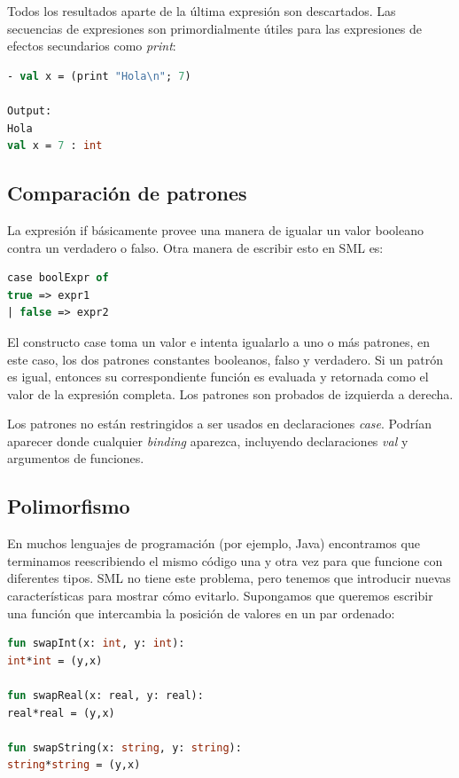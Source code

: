 \documentclass[10pt,journal,compsoc]{IEEEtran}
\begin{document}
Todos los resultados aparte de la \'ultima expresi\'on son descartados. Las secuencias de expresiones son primordialmente \'utiles para las expresiones de efectos secundarios como \textit{print}:


\begin{lstlisting}[language=ML, caption=Ejemplo Secuencias de Expresiones]
- val x = (print "Hola\n"; 7)

Output:
Hola
val x = 7 : int
\end{lstlisting}

\subsection{Comparaci\'on de patrones}
La expresi\'on if b\'asicamente provee una manera de igualar un valor booleano contra un verdadero o falso. Otra manera de escribir esto en SML es:

\begin{lstlisting}[language=ML, caption=Ejemplo Secuencias de Expresiones]
case boolExpr of
true => expr1
| false => expr2
\end{lstlisting}

El constructo case toma un valor e intenta igualarlo a uno o m\'as patrones, en este caso, los dos patrones constantes booleanos, falso y verdadero. Si un patr\'on es igual, entonces su correspondiente funci\'on es evaluada y retornada como el valor de la expresi\'on completa. Los patrones son probados de izquierda a derecha.

Los patrones no est\'an restringidos a ser usados en declaraciones \textit{case}. Podr\'ian aparecer donde cualquier \textit{binding} aparezca, incluyendo declaraciones \textit{val} y argumentos de funciones.

\subsection{Polimorfismo}
En muchos lenguajes de programación (por ejemplo, Java) encontramos que terminamos reescribiendo el mismo c\'odigo una y otra vez para que funcione con diferentes tipos. SML no tiene este problema, pero tenemos que introducir nuevas caracter\'isticas para mostrar c\'omo evitarlo. Supongamos que queremos escribir una funci\'on que intercambia la posici\'on de valores en un par ordenado:

\begin{lstlisting}[language=ML, caption=Ejemplo Polimorfismo 1]
fun swapInt(x: int, y: int):
int*int = (y,x)

fun swapReal(x: real, y: real):
real*real = (y,x)

fun swapString(x: string, y: string):
string*string = (y,x)
\end{lstlisting}
\end{document}
